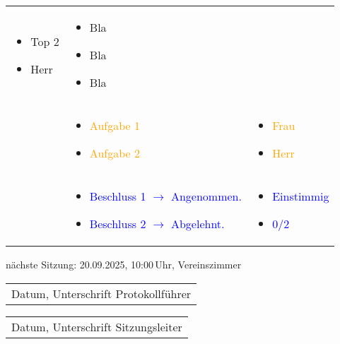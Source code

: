 \documentclass[11pt,a4paper]{article}
\begin{document}
\begin{longtable}{|p{3.4cm}|p{\dimexpr\textwidth-6.8cm}|p{3.4cm}|}
		\begin{itemize}[label={},leftmargin=*]
			\item Top 2
			\item Herr
		\end{itemize} & \begin{itemize}
			\item Bla
			\item Bla
			\item Bla
		\end{itemize} & \\
		
		& \begin{itemize}[label=\textcolor{orange}{$\rightarrow$}]
			\item \textcolor{orange}{Aufgabe 1}
			\item \textcolor{orange}{Aufgabe 2}
		\end{itemize} & \begin{itemize}[label={},leftmargin=*]
			\item \textcolor{orange}{Frau}
			\item \textcolor{orange}{Herr}
		\end{itemize} \\
		
		& \begin{itemize}[label=\textcolor{blue}{$\rightarrow$}]
			\item \textcolor{blue}{Beschluss 1 $\rightarrow$ Angenommen.}
			\item \textcolor{blue}{Beschluss 2 $\rightarrow$ Abgelehnt.}
		\end{itemize} & \begin{itemize}[label={},leftmargin=*]
			\item \textcolor{blue}{Einstimmig}
			\item \textcolor{blue}{0/2}
		\end{itemize} \\
		\hline
\end{longtable}

\newpage

nächste Sitzung: 20.09.2025, 10:00\,Uhr, Vereinszimmer
	
	\vspace{2.5cm}
	
	\begin{tabular}{p{10cm}}
		\\
		\hline
		Datum, Unterschrift Protokollführer
	\end{tabular}
	
	\vspace{1.5cm}
	
	\begin{tabular}{p{10cm}}
		\\
	\hline
	Datum, Unterschrift Sitzungsleiter
	\end{tabular}
\end{document}
